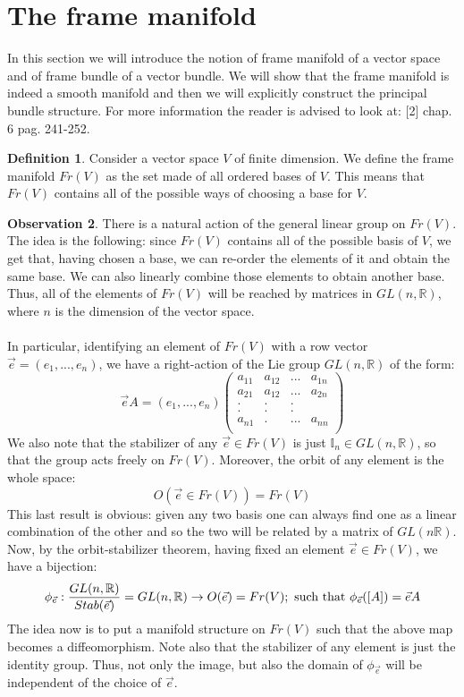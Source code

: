 \documentclass[12pt,a4paper]{report}
\theoremstyle{definition}
\newtheorem{Def}{Definition}[chapter]
\theoremstyle{Theorem}
\theoremstyle{definition}
\theoremstyle{definition}
\newtheorem{Obs}[Def]{Observation}
\begin{document}
	\section{The frame manifold}
	In this section we will introduce the notion of frame manifold of a vector space and of frame bundle of a vector bundle. We will show that the frame manifold is indeed a smooth manifold and then we will explicitly construct the principal bundle structure. For more information the reader is advised to look at: [2] chap. 6 pag. 241-252.
	\begin{Def}\label{Def_6.5}
		Consider a vector space $V$ of finite dimension. We define the frame manifold $Fr(V)$ as the set made of all ordered bases of $V$. This means that $Fr(V)$ contains all of the possible ways of choosing a base for $V$.
	\end{Def}
	\begin{Obs}
		There is a natural action of the general linear group on $Fr(V)$. The idea is the following: since $Fr(V)$ contains all of the possible basis of $V$, we get that, having chosen a base, we can re-order the elements of it and obtain the same base. We can also linearly combine those elements to obtain another base. Thus, all of the elements of $Fr(V)$ will be reached by matrices in $GL(n,\mathbb{R})$, where $n$ is the dimension of the vector space.\\
		\\
		In particular, identifying an element of $Fr(V)$ with a row vector $\vec{e}=(e_1,...,e_n)$, we have a right-action of the Lie group $GL(n,\mathbb{R})$ of the form:
		$$\vec{e}A=(e_1,...,e_n)\begin{pmatrix}
			a_{11}&a_{12}&...&a_{1n}\\
			a_{21}&a_{12}&...&a_{2n}\\
			.     &.     &.   &     \\
			.     &.     &.   &     \\
			a_{n1}&.     &...&a_{nn}\\
		\end{pmatrix}$$
		We also note that the stabilizer of any $\vec{e}\in Fr(V)$ is just $\mathbb{I}_n\in GL(n,\mathbb{R})$, so that the group acts freely on $Fr(V)$. Moreover, the orbit of any element is the whole space: 
		$$O(\vec{e}\in Fr(V))=Fr(V)$$
		This last result is obvious: given any two basis one can always find one as a linear combination of the other and so the two will be related by a matrix of $GL(n\mathbb{R})$.
		Now, by the orbit-stabilizer theorem, having fixed an element $\vec{e}\in Fr(V)$, we have a bijection:
		$$\phi_{\vec{e}}:{GL(n,\mathbb{R})\over Stab(\vec{e})}=GL(n,\mathbb{R})\rightarrow O(\vec{e})=Fr(V);\hbox{ such that } \phi_{\vec{e}}([A])=\vec{e}A$$
		The idea now is to put a manifold structure on $Fr(V)$ such that the above map becomes a diffeomorphism. Note also that the stabilizer of any element is just the identity group. Thus, not only the image, but also the domain of $\phi_{\vec{e}}$ will be independent of the choice of $\vec{e}$.
	\end{Obs}
\end{document}
